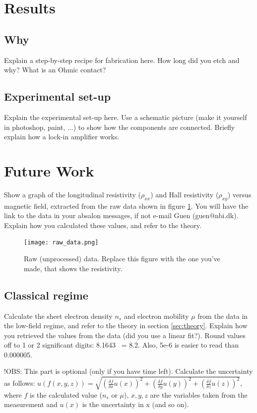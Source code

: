 \documentclass[letterpaper]{article}
\begin{document}
\section{Results}
\subsection{Why}
Explain a step-by-step recipe for fabrication here. How long did you etch and why? What is an Ohmic contact?
\subsection{Experimental set-up}
Explain the experimental set-up here. Use a schematic picture (make it yourself in photoshop, paint, ...) to show how the components are connected. Briefly explain how a lock-in amplifier works.

\section{Future Work}
Show a graph of the longitudinal resistivity ($\rho_{xx}$) and Hall resistivity ($\rho_{xy}$) versus magnetic field, extracted from the raw data shown in figure \ref{fig:data}. You will have the link to the data in your absalon messages, if not e-mail Guen (guen@nbi.dk). Explain how you calculated these values, and refer to the theory.

\begin{figure}
\centering
\texttt{[image: raw\_data.png]}
\caption{\label{fig:data}Raw (unprocessed) data. Replace this figure with the one you've made, that shows the resistivity.}
\end{figure}

\subsection{Classical regime}
Calculate the sheet electron density $n_{s}$ and electron mobility $\mu$ from the data in the low-field regime, and refer to the theory in section \ref{sec:theory}. Explain how you retrieved the values from the data (did you use a linear fit?).
Round values off to 1 or 2 significant digits: 8.1643 ~= 8.2. Also, 5e-6 is easier to read than 0.000005.

!OBS: This part is optional (only if you have time left).
Calculate the uncertainty as follows: \newline $u(f(x, y, z)) = \sqrt{(\frac{\delta f}{\delta{x}} u(x))^{2} + (\frac{\delta f}{\delta{y}} u(y))^{2} + (\frac{\delta f}{\delta{z}} u(z))^{2}}$, where $f$ is the calculated value ($n_{s}$ or $\mu$), $x, y, z$ are the variables taken from the measurement and $u(x)$ is the uncertainty in x (and so on).
\end{document}
